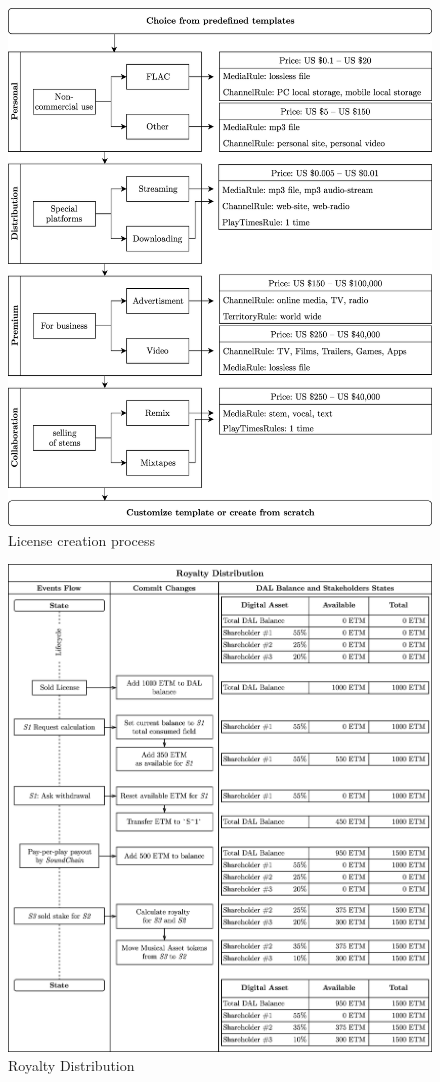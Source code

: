 \documentclass[12pt]{report}
\begin{document}
\begin{figure}[h]
\centering
\caption{License creation process}
\vspace{20pt}
\includegraphics[width=\textwidth]{licensing}
\end{figure}

\begin{figure}[h]
\centering
\caption{Royalty Distribution}
\vspace{20pt}
\includegraphics[width=\textwidth]{royalty}
\end{figure}
\end{document}
